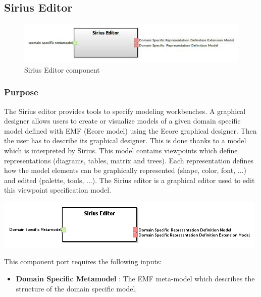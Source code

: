 \documentclass{gemoc} %
\begin{document}
\subsection{Sirius Editor}
\begin{figure}[htp]
	\begin{center}
	\includegraphics*[trim=0.0cm 0.0cm 0cm 0.0cm, clip=true, scale=1.0]{../images/generated/Generated_Sirius Editor.jpg}
	\caption{Sirius Editor component}
	\end{center}
\end{figure}

\subsubsection{Purpose}
The Sirius editor provides tools to specify modeling workbenches. A graphical designer allows users to create or visualize models of a given domain specific model defined with EMF (Ecore model) using the Ecore graphical designer. Then the user has to describe its graphical designer. This is done thanks to a model which is interpreted by Sirius. This model contains viewpoints which define representations (diagrams, tables, matrix and trees). Each representation defines how the model elements can be graphically represented (shape, color, font, ...) and edited (palette, tools, ...).
The Sirius editor is a graphical editor used to edit this viewpoint specification model.
\begin{center}
\includegraphics*[trim=0.0cm 0.0cm 0cm 0.0cm, clip=true]{../images/generated/Generated_Sirius_Editor.png}
\end{center}

This component port requires the following inputs:
\begin{itemize}
  \item \textbf{Domain Specific Metamodel} :
The EMF meta-model which describes the structure of the domain specific model.
\end{itemize}
\end{document}
